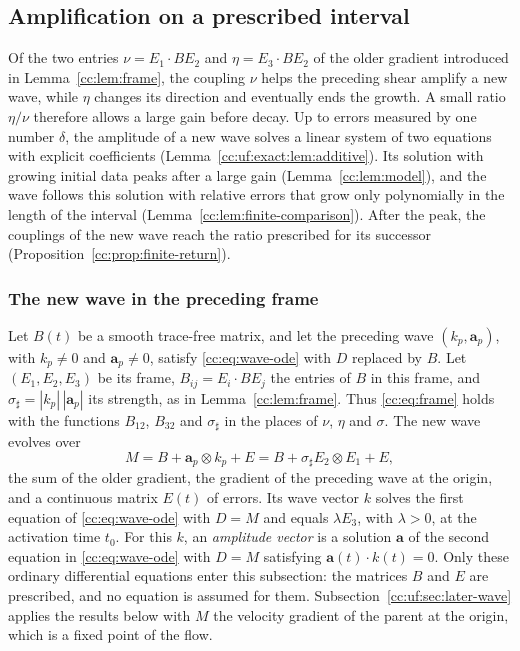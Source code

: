 \subsection{Amplification on a prescribed interval}\label{cc:sec:amplification}

Of the two entries $\nu=E_1\cdot BE_2$ and $\eta=E_3\cdot BE_2$ of the
older gradient introduced in Lemma~\ref{cc:lem:frame}, the coupling
$\nu$ helps the preceding shear amplify a new wave, while $\eta$
changes its direction and eventually ends the growth. A small ratio
$\eta/\nu$ therefore allows a large gain before decay. Up to errors
measured by one number $\delta$, the amplitude of a new wave solves a
linear system of two equations with explicit coefficients
(Lemma~\ref{cc:uf:exact:lem:additive}). Its solution with growing
initial data peaks after a large gain (Lemma~\ref{cc:lem:model}), and
the wave follows this solution with relative errors that grow only
polynomially in the length of the interval
(Lemma~\ref{cc:lem:finite-comparison}). After the peak, the couplings
of the new wave reach the ratio prescribed for its successor
(Proposition~\ref{cc:prop:finite-return}).

\subsubsection{The new wave in the preceding frame}\label{cc:sec:comparison}
Let $B(t)$ be a smooth trace-free matrix, and let the preceding wave
$(k_p,\mathbf a_p)$, with $k_p\ne0$ and $\mathbf a_p\ne0$, satisfy
\eqref{cc:eq:wave-ode} with $D$ replaced by $B$. Let $(E_1,E_2,E_3)$ be
its frame, $B_{ij}=E_i\cdot BE_j$ the entries of $B$ in this frame, and
$\sigma_\sharp=|k_p|\,|\mathbf a_p|$ its strength, as in
Lemma~\ref{cc:lem:frame}. Thus \eqref{cc:eq:frame} holds with the
functions $B_{12}$, $B_{32}$ and $\sigma_\sharp$ in the places of
$\nu$, $\eta$ and $\sigma$. The new wave evolves over
\[
 M=B+\mathbf a_p\otimes k_p+E=B+\sigma_\sharp E_2\otimes E_1+E,
\]
the sum of the older gradient, the gradient of the preceding wave at
the origin, and a continuous matrix $E(t)$ of errors. Its wave vector
$k$ solves the first equation of \eqref{cc:eq:wave-ode} with $D=M$ and
equals $\lambda E_3$, with $\lambda>0$, at the activation time $t_0$.
For this $k$, an \emph{amplitude vector} is a solution $\mathbf a$ of
the second equation in \eqref{cc:eq:wave-ode} with $D=M$ satisfying
$\mathbf a(t)\cdot k(t)=0$. Only these ordinary differential equations
enter this subsection: the matrices $B$ and $E$ are prescribed, and no
equation is assumed for them. Subsection~\ref{cc:uf:sec:later-wave}
applies the results below with $M$ the velocity gradient of the parent
at the origin, which is a fixed point of the flow.

